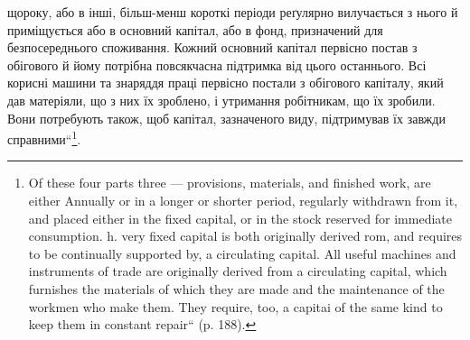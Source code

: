\parcont{}  %
щороку, або в інші, більш-менш короткі періоди реґулярно вилучається
з нього й приміщується або в основний капітал, або в фонд, призначений
для безпосереднього споживання. Кожний основний капітал первісно
постав з обігового й йому потрібна повсякчасна підтримка від цього
останнього. Всі корисні машини та знаряддя праці первісно постали з
обігового капіталу, який дав матеріяли, що з них їх зроблено, і утримання
робітникам, що їх зробили. Вони потребують також, щоб капітал,
зазначеного виду, підтримував їх завжди справними“\footnote*{
Of these four parts three — provisions, materials, and finished work, are either
Annually or in a longer or shorter period, regularly withdrawn from it, and placed
either in the fixed capital, or in the stock reserved for immediate consumption.
h. very fixed capital is both originally derived rom, and requires to be continually
supported by, a circulating capital. All useful machines and instruments of trade are
originally derived from a circulating capital, which furnishes the materials of which
they are made and the maintenance of the workmen who make them. They require,
too, a capitai of the same kind to keep them in constant repair“ (p. 188).
}.

